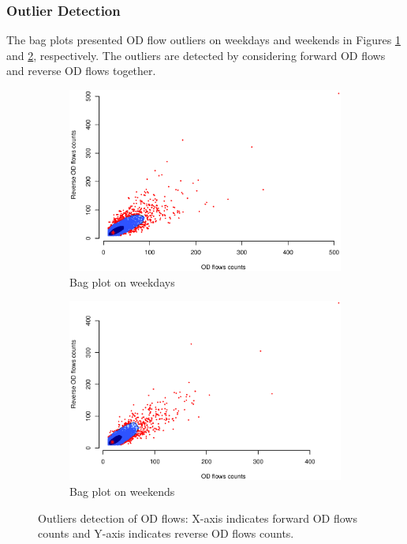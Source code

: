 \documentclass[a4paper,UKenglish]{lipics-v2018}
\begin{document}
\subsubsection{Outlier Detection}
The bag plots presented OD flow outliers on weekdays and weekends in Figures \ref{fig:weekdays_bag} and \ref{fig:weekends_bag}, respectively.
The outliers are detected by considering forward OD flows and reverse OD flows together.

\begin{figure}
	\centering
	\begin{subfigure}[b]{0.49\textwidth}
		\includegraphics[width=\textwidth]{images/OD_weekdays.eps}
		\caption{Bag plot on weekdays}
		\label{fig:weekdays_bag}
	\end{subfigure}
	\hfill %
	\begin{subfigure}[b]{0.49\textwidth}
		\includegraphics[width=\textwidth]{images/OD_weekends.eps}
		\caption{Bag plot on weekends}
		\label{fig:weekends_bag}
	\end{subfigure}
	\caption{Outliers detection of OD flows: X-axis indicates forward OD flows counts and Y-axis indicates reverse OD flows counts.}\label{fig:week_weekends_bag}	
\end{figure}
\end{document}
